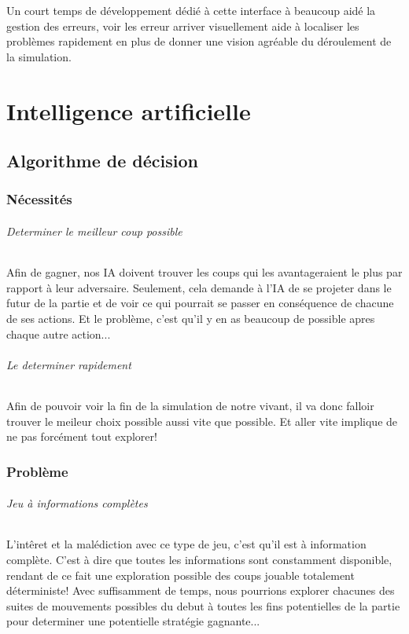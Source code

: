 \documentclass{scrreprt}
\begin{document}
    \begin{result}
        Un court temps de développement dédié à cette interface à beaucoup
        aidé la gestion des erreurs, voir les erreur arriver visuellement
        aide à localiser les problèmes rapidement en plus de donner une
        vision agréable du déroulement de la simulation.
    \end{result}

    \part{Intelligence artificielle}

    \chapter{Algorithme de décision}

    \section{Nécessités}

    \paragraph{Determiner le meilleur coup possible}
    Afin de gagner, nos IA doivent trouver les coups qui les avantageraient
    le plus par rapport à leur adversaire.
    Seulement, cela demande à l'IA de se projeter dans le futur de la partie
    et de voir ce qui pourrait se passer en conséquence de chacune de ses
    actions.
    Et le problème, c'est qu'il y en as beaucoup de possible apres chaque
    autre action...

    \paragraph{Le determiner rapidement}
    Afin de pouvoir voir la fin de la simulation de notre vivant, il va donc
    falloir trouver le meileur choix possible aussi vite que possible.
    Et aller vite implique de ne pas forcément tout explorer!

    \section{Problème}

    \paragraph{Jeu à informations complètes}
    L'intêret et la malédiction avec ce type de jeu, c'est qu'il
    est à information complète.
    C'est à dire que toutes les informations sont constamment disponible,
    rendant de ce fait une exploration possible des coups jouable totalement
    déterministe!
    Avec suffisamment de temps, nous pourrions explorer chacunes des suites
    de mouvements possibles du debut à toutes les fins potentielles de la
    partie pour determiner une potentielle stratégie gagnante...
\end{document}
